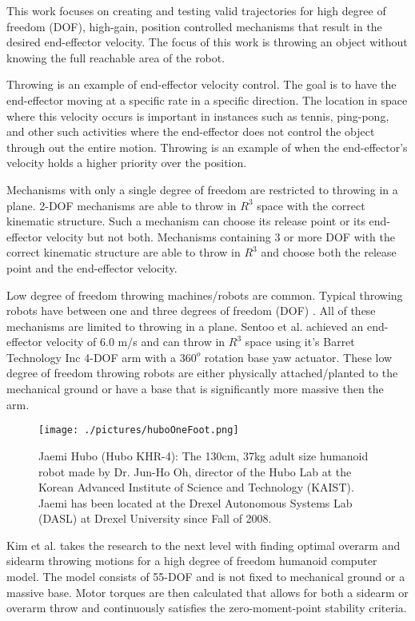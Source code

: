 This work focuses on creating and testing valid trajectories for high degree of freedom (DOF), high-gain, position controlled mechanisms that result in the desired end-effector velocity.  The focus of this work is throwing an object without knowing the full reachable area of the robot.

Throwing is an example of end-effector velocity control.  The goal is to have the end-effector moving at a specific rate in a specific direction.  The location in space where this velocity occurs is important in instances such as tennis, ping-pong, and other such activities where the end-effector does not control the object through out the entire motion.  Throwing is an example of when the end-effector's velocity holds a higher priority over the position.  

Mechanisms with only a single degree of freedom are restricted to throwing in a plane.   2-DOF mechanisms are able to throw in $R^3$ space with the correct kinematic structure.  Such a mechanism can choose its release point or its end-effector velocity but not both.  Mechanisms containing 3 or more DOF with the correct kinematic structure are able to throw in $R^3$ and choose both the release point and the end-effector velocity.  

Low degree of freedom throwing machines/robots are common.  Typical throwing robots have between one and three degrees of freedom (DOF) \cite{509405, Lynch97dynamicnonprehensile, 5152525, 509335, springerlink:10.1007/s10015-006-0401-0}.  All of these mechanisms are limited to throwing in a plane.   Sentoo et al.\cite{4651142} achieved an end-effector velocity of 6.0 m/s and can throw in $R^3$ space using it's Barret Technology Inc 4-DOF arm with a $360^o$ rotation base yaw actuator.  These low degree of freedom throwing robots are either physically attached/planted to the mechanical ground or have a base that is significantly more massive then the arm.  

\begin{figure}[thpb]\label{fig:huboOneFoot}
  \centering
\texttt{[image: ./pictures/huboOneFoot.png]}
  \caption{Jaemi Hubo (Hubo KHR-4): The 130cm, 37kg adult size humanoid robot made by Dr. Jun-Ho Oh, director of the Hubo Lab at the Korean Advanced Institute of Science and Technology (KAIST).  Jaemi has been located at the Drexel Autonomous Systems Lab (DASL) at Drexel University since Fall of 2008. }
\end{figure}

Kim et al. \cite{5686315,JooH2011438} takes the research to the next level with finding optimal overarm and sidearm throwing motions for a high degree of freedom humanoid computer model.  The model consists of 55-DOF and is not fixed to mechanical ground or a massive base.  Motor torques are then calculated that allows for both a sidearm or overarm throw and continuously satisfies the zero-moment-point stability criteria\cite{4309277}.  

